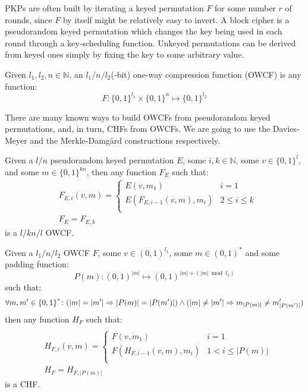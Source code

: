 \noindent PKPs are often built by iterating a keyed permutation \(F\) for some number \(r\) of 
rounds, since \(F\) by itself might be relatively easy to invert.
A block cipher is a pseudorandom keyed permutation which changes the key being used in each
round through a key-scheduling function.
Unkeyed permutations can be derived from keyed ones simply by fixing the key to some arbitrary
value.
\begin{definition}
	Given \(l_1, l_2, n \in \mathbb{N}\), an \(l_1/n/l_2\)(-bit) one-way compression function (OWCF) 
	is any function:
	\[F\colon {\{0, 1\}}^{l_1} \times {\{0, 1\}}^n \mapsto {\{0, 1\}}^{l_2}\]
\end{definition}

\noindent There are many known ways to build OWCFs from pseudorandom keyed
permutations, and, in turn, CHFs from OWCFs.
We are going to use the Davies-Meyer and the Merkle-Damg\r{a}rd constructions respectively. 
\begin{theorem}
	Given a \(l/n\) pseudorandom keyed permutation \(E\), some \(i, k \in \mathbb{N}\), some
	\(v \in {\{0, 1\}}^l\), and some \(m \in {\{0, 1\}}^{kn}\), then any function \(F_E\) such that:
	\begin{align*}
		 & F_{E,i}(v, m) =
		\begin{cases}
			E(v, m_1)                & i = 1         \\
			E(F_{E, i-1}(v, m), m_i) & 2 \le i \le k \\
		\end{cases} \\
		 & F_E = F_{E, k}
	\end{align*}
	is a \(l/kn/l\) OWCF\@.
\end{theorem}
\begin{theorem}
	Given a \(l_1/n/l_2\) OWCF \(F\), some \(v \in {(0, 1)}^{l_1}\), some \(m \in {(0, 1)}^*\) and 
	some padding function:
	\[P(m)\colon {(0, 1)}^{|m|} \mapsto {(0, 1)}^{|m| + (|m| \bmod l_1)}\]
	such that:
	\[\forall m, m' \in {\{0, 1\}}^*\colon (|m| = |m'| \Rightarrow |P(m)| = |P(m')|) \wedge (|m| \neq |m'| \Rightarrow
		m_{|P(m)|} \neq m'_{|P(m')|})\]
	then any function \(H_F\) such that:
	\begin{align*}
		 &                                                              \\
		 & H_{F, i}(v, m) =
		\begin{cases}
			F(v, m_1)                & i = 1            \\
			F(H_{F, i-1}(v, m), m_i) & 1 < i \le |P(m)| \\
		\end{cases} \\
		 & H_F = H_{F, |P(m)|}
	\end{align*}
	is a CHF\@.
\end{theorem}

